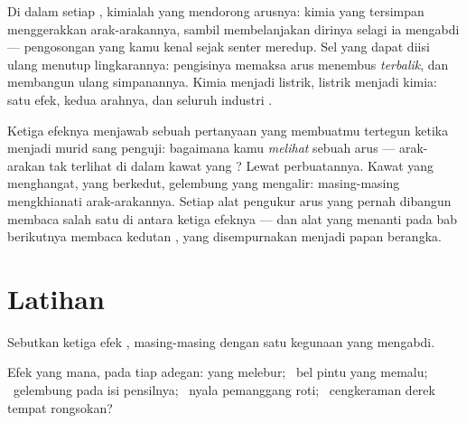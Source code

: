 \begin{example}\label{ex:g8:electric-current-effects:battery}
Di dalam setiap , kimialah yang mendorong arusnya:  kimia
yang tersimpan menggerakkan arak-arakannya, sambil membelanjakan
dirinya selagi ia mengabdi --- pengosongan yang kamu kenal sejak
senter meredup. Sel yang dapat diisi ulang menutup lingkarannya:
pengisinya memaksa arus menembus \emph{terbalik}, dan 
membangun ulang simpanannya. Kimia menjadi listrik, listrik menjadi
kimia: satu efek, kedua arahnya, dan seluruh industri .
\end{example}

\begin{remark}\label{rem:g8:electric-current-effects:detect}
Ketiga efeknya menjawab sebuah pertanyaan yang membuatmu tertegun
ketika menjadi murid sang penguji: bagaimana kamu \emph{melihat}
sebuah arus --- arak-arakan tak terlihat di dalam kawat yang ?
Lewat perbuatannya. Kawat yang menghangat,  yang berkedut,
gelembung yang mengalir: masing-masing mengkhianati arak-arakannya.
Setiap alat pengukur arus yang pernah dibangun membaca salah satu di
antara ketiga efeknya --- dan alat yang menanti pada bab berikutnya
membaca kedutan , yang disempurnakan menjadi papan berangka.
\end{remark}

\section{Latihan}

\begin{exercise}[$\star$]\label{exo:g8:electric-current-effects:1}
Sebutkan ketiga efek , masing-masing dengan satu kegunaan
yang mengabdi.
\end{exercise}

\begin{exercise}[$\star$]\label{exo:g8:electric-current-effects:2}
Efek yang mana, pada tiap adegan:  yang melebur; \ bel pintu
yang memalu; \ gelembung pada isi pensilnya; \ nyala pemanggang roti;
\ cengkeraman derek tempat rongsokan?
\end{exercise}

